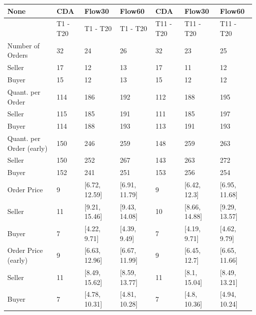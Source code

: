 \begin{tabular}{lllllll}
\hline
 None                     & CDA      & Flow30        & Flow60        & CDA       & Flow30        & Flow60        \\
\hline
                          & T1 - T20 & T1 - T20      & T1 - T20      & T11 - T20 & T11 - T20     & T11 - T20     \\
 Number of Orders         & 32       & 24            & 26            & 32        & 23            & 25            \\
 Seller                   & 17       & 12            & 13            & 17        & 11            & 12            \\
 Buyer                    & 15       & 12            & 13            & 15        & 12            & 12            \\
 Quant. per Order         & 114      & 186           & 192           & 112       & 188           & 195           \\
 Seller                   & 115      & 185           & 191           & 111       & 185           & 197           \\
 Buyer                    & 114      & 188           & 193           & 113       & 191           & 193           \\
 Quant. per Order (early) & 150      & 246           & 259           & 148       & 259           & 263           \\
 Seller                   & 150      & 252           & 267           & 143       & 263           & 272           \\
 Buyer                    & 152      & 241           & 251           & 153       & 256           & 254           \\
 Order Price              & 9        & [6.72, 12.59] & [6.91, 11.79] & 9         & [6.42, 12.3]  & [6.95, 11.68] \\
 Seller                   & 11       & [9.21, 15.46] & [9.43, 14.08] & 10        & [8.66, 14.88] & [9.29, 13.57] \\
 Buyer                    & 7        & [4.22, 9.71]  & [4.39, 9.49]  & 7         & [4.19, 9.71]  & [4.62, 9.79]  \\
 Order Price (early)      & 9        & [6.63, 12.96] & [6.67, 11.99] & 9         & [6.45, 12.7]  & [6.65, 11.66] \\
 Seller                   & 11       & [8.49, 15.62] & [8.59, 13.77] & 11        & [8.1, 15.04]  & [8.49, 13.21] \\
 Buyer                    & 7        & [4.78, 10.31] & [4.81, 10.28] & 7         & [4.8, 10.36]  & [4.94, 10.24] \\

\end{tabular}
